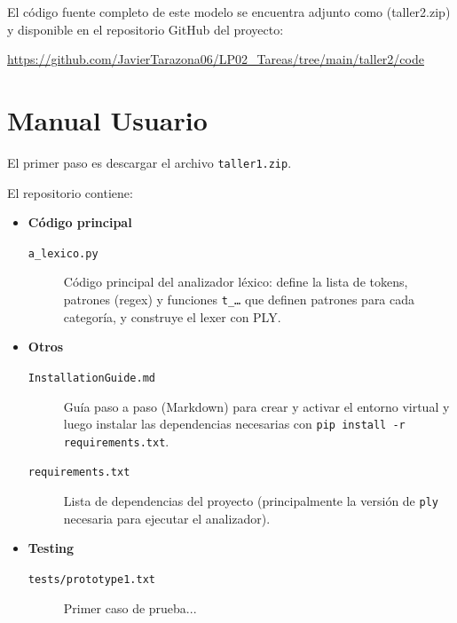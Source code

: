 \documentclass{article}
\begin{document}
El código fuente completo de este modelo se encuentra adjunto como 
(taller2.zip)
y disponible en el repositorio GitHub del proyecto:

\begin{center}
\url{https://github.com/JavierTarazona06/LP02_Tareas/tree/main/taller2/code}
\end{center}


\section{Manual Usuario}\label{sec:man_u}

El primer paso es descargar el archivo \texttt{taller1.zip}.

El repositorio contiene:
\begin{itemize}
  \item \textbf{Código principal}
  \begin{description}
    \item[\texttt{a\_lexico.py}] Código principal del analizador léxico: 
      define la lista de tokens, patrones (regex) y funciones \texttt{t\_…} que definen patrones
      para cada categoría, y construye el lexer con PLY.
  \end{description}

  \item \textbf{Otros}
  \begin{description}
    \item[\texttt{InstallationGuide.md}] Guía paso a paso (Markdown) para crear y 
      activar el entorno virtual y luego instalar las dependencias necesarias con 
      \texttt{pip install -r requirements.txt}.
    \item[\texttt{requirements.txt}] Lista de dependencias del proyecto 
      (principalmente la versión de \texttt{ply} necesaria para ejecutar el analizador).
  \end{description}

  \item \textbf{Testing}
  \begin{description}
    \item[\texttt{tests/prototype1.txt}] Primer caso de prueba...
  \end{description}
\end{itemize}
\end{document}
